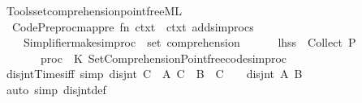 \begin{isabellebody}
%
\isatagdocument
%
\isamarkuptrue%
%
\endisatagdocument
{\isafolddocument}%
%
\isadelimdocument
%
\endisadelimdocument
%
\isadelimML
%
\endisadelimML
%
\isatagML
{}\isamarkupfalse%
\ {\isacartoucheopen}Tools{\isacharslash}{\kern0pt}set{\isacharunderscore}{\kern0pt}comprehension{\isacharunderscore}{\kern0pt}pointfree{\isachardot}{\kern0pt}ML{\isacartoucheclose}\isanewline
\isanewline
{}\isamarkupfalse%
\ {\isacartoucheopen}\isanewline
\ \ Code{\isacharunderscore}{\kern0pt}Preproc{\isachardot}{\kern0pt}map{\isacharunderscore}{\kern0pt}pre\ {\isacharparenleft}{\kern0pt}fn\ ctxt\ {\isacharequal}{\kern0pt}{\isachargreater}{\kern0pt}\ ctxt\ addsimprocs\isanewline
\ \ \ \ {\isacharbrackleft}{\kern0pt}Simplifier{\isachardot}{\kern0pt}make{\isacharunderscore}{\kern0pt}simproc\ \isactrlcontext \ {\isachardoublequote}{\kern0pt}set\ comprehension{\isachardoublequote}{\kern0pt}\isanewline
\ \ \ \ \ \ {\isacharbraceleft}{\kern0pt}lhss\ {\isacharequal}{\kern0pt}\ {\isacharbrackleft}{\kern0pt}\isactrlterm {\isasymopen}Collect\ P{\isasymclose}{\isacharbrackright}{\kern0pt}{\isacharcomma}{\kern0pt}\isanewline
\ \ \ \ \ \ \ proc\ {\isacharequal}{\kern0pt}\ K\ Set{\isacharunderscore}{\kern0pt}Comprehension{\isacharunderscore}{\kern0pt}Pointfree{\isachardot}{\kern0pt}code{\isacharunderscore}{\kern0pt}simproc{\isacharbraceright}{\kern0pt}{\isacharbrackright}{\kern0pt}{\isacharparenright}{\kern0pt}\isanewline
{\isacartoucheclose}%
\endisatagML
{\isafoldML}%
%
\isadelimML
%
\endisadelimML
%
\isadelimdocument
%
\endisadelimdocument
%
\isatagdocument
%
\isamarkuptrue%
%
\endisatagdocument
{\isafolddocument}%
%
\isadelimdocument
%
\endisadelimdocument
{}\isamarkupfalse%
\ disjnt{\isacharunderscore}{\kern0pt}Times{}{\isacharunderscore}{\kern0pt}iff\ {\isacharbrackleft}{\kern0pt}simp{\isacharbrackright}{\kern0pt}{\isacharcolon}{\kern0pt}\ {\isachardoublequoteopen}disjnt\ {\isacharparenleft}{\kern0pt}C\ {\isasymtimes}\ A{\isacharparenright}{\kern0pt}\ {\isacharparenleft}{\kern0pt}C\ {\isasymtimes}\ B{\isacharparenright}{\kern0pt}\ {\isasymlongleftrightarrow}\ C\ {\isacharequal}{\kern0pt}\ {\isacharbraceleft}{\kern0pt}{\isacharbraceright}{\kern0pt}\ {\isasymor}\ disjnt\ A\ B{\isachardoublequoteclose}\isanewline
%
\isadelimproof
\ \ %
\endisadelimproof
%
\isatagproof
{}\isamarkupfalse%
\ {\isacharparenleft}{\kern0pt}auto\ simp{\isacharcolon}{\kern0pt}\ disjnt{\isacharunderscore}{\kern0pt}def{\isacharparenright}{\kern0pt}%

\end{isabellebody}
